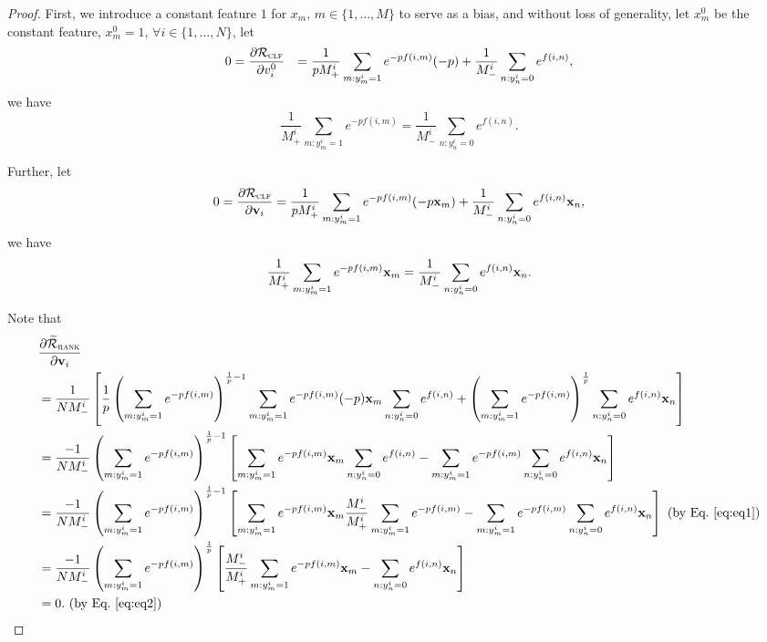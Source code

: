 \begin{proof}
First, we introduce a constant feature $1$ for $x_m, \, m \in \{1,\dots,M\}$ to serve as a bias, 
and without loss of generality, let $x_m^0$ be the constant feature, \ie $x_m^0 = 1$, 
$\forall i \in \{1,\dots,N\}$, let
\begin{equation*}
\begin{aligned}
0 
&= \frac{\partial \mathcal{R}_\textsc{clf}} {\partial v_i^0}
&= \frac{1}{p M_+^i} \sum_{m: y_m^i = 1} e^{-p f(i, m)} (-p) + \frac{1}{M_-^i} \sum_{n: y_n^i = 0} e^{f(i, n)},
\end{aligned}
\end{equation*}
we have
\begin{equation}
\label{eq:eq1}
\frac{1}{M_+^i} \sum_{m: y_m^i = 1} e^{-p f(i, m)} = \frac{1}{M_-^i} \sum_{n: y_n^i = 0} e^{f(i, n)}.
\end{equation}

Further, let
\begin{equation*}
0 
= \frac{\partial \mathcal{R}_\textsc{clf}} {\partial \mathbf{v}_i} 
= \frac{1}{p M_+^i} \sum_{m: y_m^i = 1} e^{-p f(i, m)} (-p \mathbf{x}_m) + \frac{1}{M_-^i} \sum_{n: y_n^i = 0} e^{f(i, n)} \mathbf{x}_n,
\end{equation*}
we have
\begin{equation}
\label{eq:eq2}
\frac{1}{M_+^i} \sum_{m: y_m^i = 1} e^{-p f(i, m)} \mathbf{x}_m = \frac{1}{M_-^i} \sum_{n: y_n^i = 0} e^{f(i, n)} \mathbf{x}_n.
\end{equation}

Note that
\begin{equation*}
\begin{aligned}
&\frac{\partial \widetilde{\mathcal{R}}_\textsc{rank}} {\partial \mathbf{v}_i} \\
&= \frac{1}{N M_-^i} \left[ \frac{1}{p} 
   \left( \sum_{m: y_m^i=1} e^{-p f(i, m)} \right)^{\frac{1}{p} - 1} \sum_{m: y_m^i=1} e^{-p f(i, m)} (-p) \mathbf{x}_m \sum_{n: y_n^i=0} e^{f(i, n)}
   + \left( \sum_{m: y_m^i = 1} e^{-p f(i, m)} \right)^\frac{1}{p} \sum_{n: y_n^i = 0} e^{f(i, n)} \mathbf{x}_n \right] \\
&= \frac{-1}{N M_-^i} \left( \sum_{m: y_m^i=1} e^{-p f(i, m)} \right)^{\frac{1}{p} - 1} 
   \left[ \sum_{m: y_m^i=1} e^{-p f(i, m)} \mathbf{x}_m \sum_{n: y_n^i=0} e^{f(i, n)}
   - \sum_{m: y_m^i = 1} e^{-p f(i, m)} \sum_{n: y_n^i = 0} e^{f(i, n)} \mathbf{x}_n \right] \\
&= \frac{-1}{N M_-^i} \left( \sum_{m: y_m^i=1} e^{-p f(i, m)} \right)^{\frac{1}{p} - 1} 
   \left[ \sum_{m: y_m^i=1} e^{-p f(i, m)} \mathbf{x}_m \frac{M_-^i}{M_+^i} \sum_{m: y_m^i=1} e^{-p f(i, m)}
   - \sum_{m: y_m^i = 1} e^{-p f(i, m)} \sum_{n: y_n^i = 0} e^{f(i, n)} \mathbf{x}_n \right] \ \text{(by Eq.~\ref{eq:eq1})} \\
&= \frac{-1}{N M_-^i} \left( \sum_{m: y_m^i=1} e^{-p f(i, m)} \right)^\frac{1}{p} 
   \left[ \frac{M_-^i}{M_+^i} \sum_{m: y_m^i=1} e^{-p f(i, m)} \mathbf{x}_m - \sum_{n: y_n^i = 0} e^{f(i, n)} \mathbf{x}_n \right] \\
&= 0. \ \text{(by Eq.~\ref{eq:eq2})}
\end{aligned}
\end{equation*}


\end{proof}
